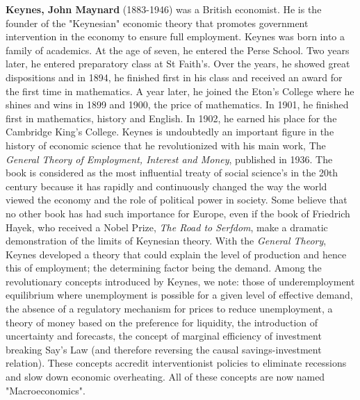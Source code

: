 \textbf{Keynes, John Maynard} (1883-1946) was a British economist. He is the founder of the "Keynesian" economic theory that promotes government intervention in the economy to ensure full employment. Keynes was born into a family of academics. At the age of seven, he entered the Perse School. Two years later, he entered preparatory class at St Faith's. Over the years, he showed great dispositions and in 1894, he finished first in his class and received an award for the first time in mathematics. A year later, he joined the Eton's College where he shines and wins in 1899 and 1900, the price of mathematics. In 1901, he finished first in mathematics, history and English. In 1902, he earned his place for the Cambridge King's College. Keynes is undoubtedly an important figure in the history of economic science that he revolutionized with his main work, The\textit{ General Theory of Employment, Interest and Money}, published in 1936. The book is considered as the most influential treaty of social science's in the 20th century because it has rapidly and continuously changed the way the world viewed the economy and the role of political power in society. Some believe that no other book has had such importance for Europe, even if the book of Friedrich Hayek, who received a Nobel Prize, \textit{The Road to Serfdom}, make a dramatic demonstration of the limits of Keynesian theory. With the \textit{General Theory}, Keynes developed a theory that could explain the level of production and hence this of employment; the determining factor being the demand. Among the revolutionary concepts introduced by Keynes, we note: those of underemployment equilibrium where unemployment is possible for a given level of effective demand, the absence of a regulatory mechanism for prices to reduce unemployment, a theory of money based on the preference for liquidity, the introduction of uncertainty and forecasts, the concept of marginal efficiency of investment breaking Say's Law (and therefore reversing the causal savings-investment relation). These concepts accredit interventionist policies to eliminate recessions and slow down economic overheating. All of these concepts are now named "Macroeconomics".

